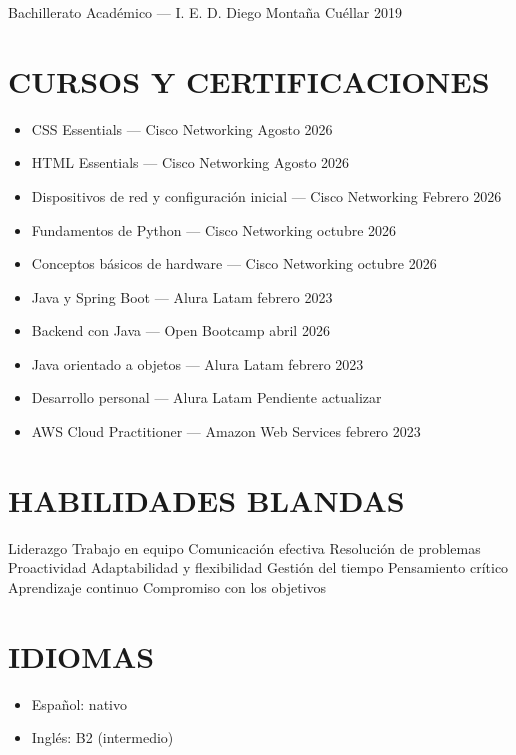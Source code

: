 \documentclass[10pt,a4paper]{article}
\begin{document}
Bachillerato Académico — I. E. D. Diego Montaña Cuéllar \textbar{} 2019

\section*{CURSOS Y CERTIFICACIONES}
\begin{itemize}
    \item CSS Essentials — Cisco Networking \textbar{} Agosto 2026
    \item HTML Essentials — Cisco Networking \textbar{} Agosto 2026
    \item Dispositivos de red y configuración inicial — Cisco Networking \textbar{} Febrero 2026
    \item Fundamentos de Python — Cisco Networking \textbar{} octubre 2026
    \item Conceptos básicos de hardware — Cisco Networking \textbar{} octubre 2026
    \item Java y Spring Boot — Alura Latam \textbar{} febrero 2023
    \item Backend con Java — Open Bootcamp \textbar{} abril 2026
    \item Java orientado a objetos — Alura Latam \textbar{} febrero 2023
    \item Desarrollo personal — Alura Latam \textbar{} Pendiente actualizar
    \item AWS Cloud Practitioner — Amazon Web Services \textbar{} febrero 2023
\end{itemize}

\section*{HABILIDADES BLANDAS}
Liderazgo \textbar{} Trabajo en equipo \textbar{} Comunicación efectiva \textbar{} Resolución de problemas \textbar{} Proactividad \textbar{} Adaptabilidad y flexibilidad \textbar{} Gestión del tiempo \textbar{} Pensamiento crítico \textbar{} Aprendizaje continuo \textbar{} Compromiso con los objetivos

\section*{IDIOMAS}
\begin{itemize}
    \item Español: nativo
    \item Inglés: B2 (intermedio)
\end{itemize}
\end{document}
